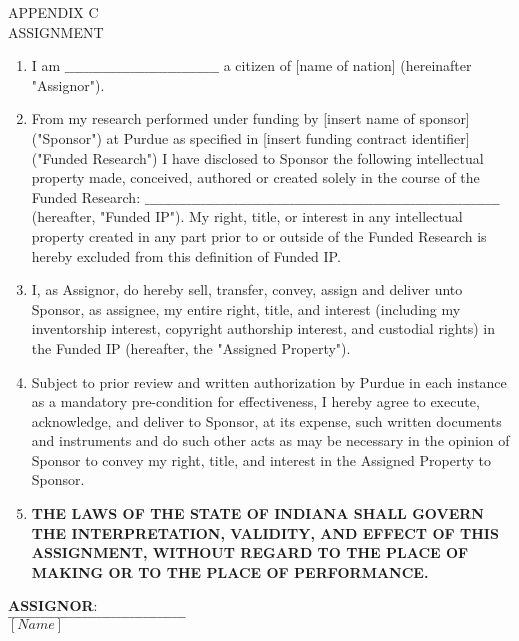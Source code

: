 \begin{center}
    APPENDIX C\\
    ASSIGNMENT
\end{center}

\begin{enumerate}
\item I am $\_\_\_\_\_\_\_\_\_\_\_\_\_\_\_\_\_\_\_\_\_\_\_\_\_\_\_\_\_\_\_\_\_$
a citizen of [name of nation] (hereinafter "Assignor").

    \item From my research performed under funding by [insert name of sponsor] ("Sponsor") at Purdue as specified in  [insert funding contract identifier]  ("Funded Research") I have disclosed to Sponsor the following intellectual property made, conceived, authored or created solely in the course of the Funded Research:
$\_\_\_\_\_\_\_\_\_\_\_\_\_\_\_\_\_\_\_\_\_\_\_\_\_\_\_\_\_\_\_\_\_
\_\_\_\_\_\_\_\_\_\_\_\_\_\_\_\_\_\_\_\_\_\_\_\_\_\_\_\_\_\_\_\_\_ \_\_\_\_\_\_\_\_\_\_$
    (hereafter, "Funded IP").  My right, title, or interest in any intellectual property created in any part prior to or outside of the Funded Research is hereby excluded from this definition of Funded IP.

    \item I, as Assignor, do hereby sell, transfer, convey, assign and deliver unto Sponsor, as assignee, my entire right, title, and interest (including my inventorship interest, copyright authorship interest, and custodial rights) in the Funded IP (hereafter, the "Assigned Property").

    \item Subject to prior review and written authorization by Purdue in each instance as a mandatory pre-condition for effectiveness, I hereby agree to execute, acknowledge, and deliver to Sponsor, at its expense, such written documents and instruments and do such other acts as may be necessary in the opinion of Sponsor to convey my right, title, and interest in the Assigned Property to Sponsor.

    \item \textbf{THE LAWS OF THE STATE OF INDIANA SHALL GOVERN THE INTERPRETATION, VALIDITY, AND EFFECT OF THIS ASSIGNMENT, WITHOUT REGARD TO THE PLACE OF MAKING OR TO THE PLACE OF PERFORMANCE.}
\end{enumerate}


\noindent \textbf{ASSIGNOR}:\\
$\_\_\_\_\_\_\_\_\_\_\_\_\_\_\_\_\_\_\_\_\_\_\_\_\_\_\_\_\_\_\_\_\_\_\_\_\_\_$\\
$[Name]$\\

